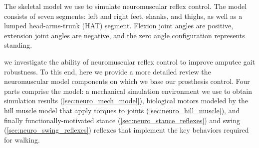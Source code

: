 \begin{marginfigure}
    \caption{The skeletal model we use to simulate neuromuscular reflex control.
    The model consists of seven segments: left and right feet, shanks, and
    thighs, as well as a lumped head-arms-trunk (HAT) segment. Flexion joint
    angles are positive, extension joint angles are negative, and the zero
    angle configuration represents standing.}
    \label{fig:neuro_seven_link}
\end{marginfigure}

 we investigate the ability of
neuromuscular reflex control to improve amputee gait robustness. To this end,
here we provide a more detailed review the neuromuscular model components on
which we base our prosthesis control. Four parts comprise the model: a
mechanical simulation environment we use to obtain simulation results
(\cref{sec:neuro_mech_model}), biological motors modeled by the hill muscle
model that apply torques to joints (\cref{sec:neuro_hill_muscle}), and finally
functionally-motivated stance (\cref{sec:neuro_stance_reflexes}) and swing
(\cref{sec:neuro_swing_reflexes}) reflexes that implement the key behaviors
required for walking.




